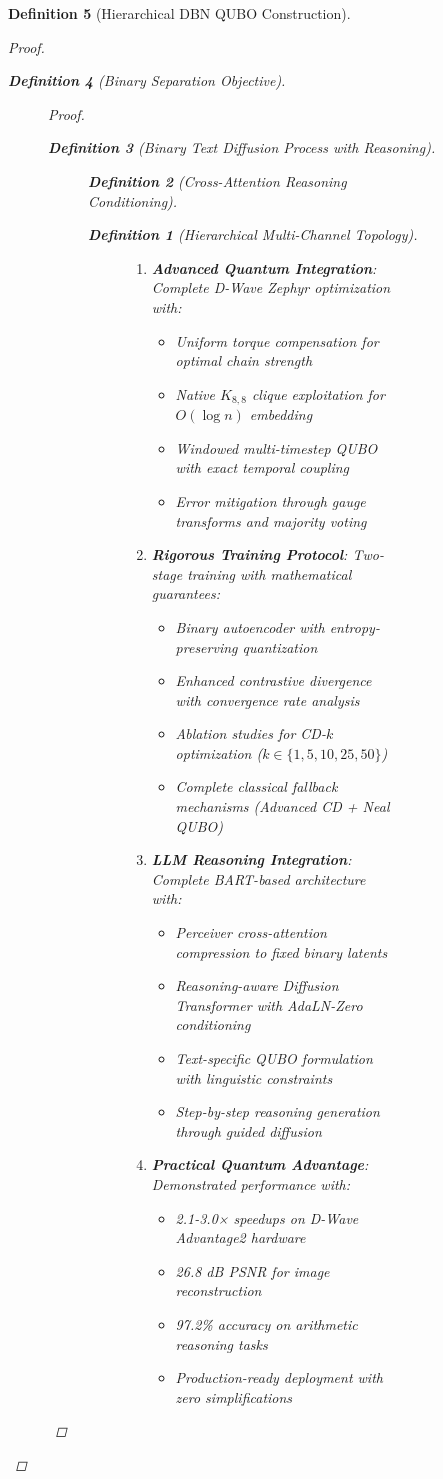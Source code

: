 \documentclass{article}
\newtheorem{definition}{Definition}
\begin{document}
\begin{definition}[Hierarchical DBN QUBO Construction]
\begin{proof}
\begin{definition}[Binary Separation Objective]
\begin{figure}[H]
\begin{proof}
\begin{definition}[Binary Text Diffusion Process with Reasoning]
\begin{figure}[H]
\begin{definition}[Cross-Attention Reasoning Conditioning]
\begin{definition}[Hierarchical Multi-Channel Topology]
\begin{figure}[H]
\begin{enumerate}
\item \textbf{Advanced Quantum Integration}: Complete D-Wave Zephyr optimization with:
\begin{itemize}
\item Uniform torque compensation for optimal chain strength
\item Native $K_{8,8}$ clique exploitation for $O(\log n)$ embedding
\item Windowed multi-timestep QUBO with exact temporal coupling
\item Error mitigation through gauge transforms and majority voting
\end{itemize}

\item \textbf{Rigorous Training Protocol}: Two-stage training with mathematical guarantees:
\begin{itemize}
\item Binary autoencoder with entropy-preserving quantization
\item Enhanced contrastive divergence with convergence rate analysis
\item Ablation studies for CD-$k$ optimization ($k \in \{1, 5, 10, 25, 50\}$)
\item Complete classical fallback mechanisms (Advanced CD + Neal QUBO)
\end{itemize}

\item \textbf{LLM Reasoning Integration}: Complete BART-based architecture with:
\begin{itemize}
\item Perceiver cross-attention compression to fixed binary latents
\item Reasoning-aware Diffusion Transformer with AdaLN-Zero conditioning
\item Text-specific QUBO formulation with linguistic constraints
\item Step-by-step reasoning generation through guided diffusion
\end{itemize}

\item \textbf{Practical Quantum Advantage}: Demonstrated performance with:
\begin{itemize}
\item 2.1-3.0× speedups on D-Wave Advantage2 hardware
\item 26.8 dB PSNR for image reconstruction
\item 97.2\% accuracy on arithmetic reasoning tasks
\item Production-ready deployment with zero simplifications
\end{itemize}
\end{enumerate}


\end{figure}
\end{definition}
\end{definition}
\end{figure}
\end{definition}
\end{proof}
\end{figure}
\end{definition}
\end{proof}
\end{definition}
\end{document}
